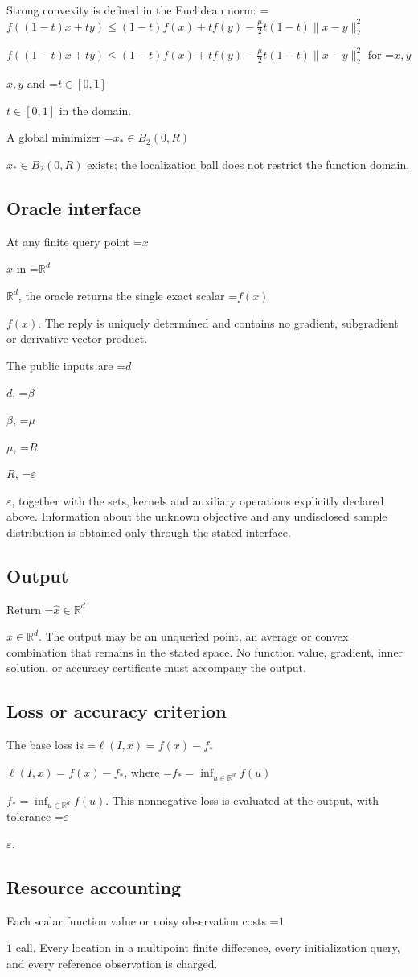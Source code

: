 \documentclass[10pt,a4paper]{article}
\newcommand{\AtlasMath}[1]{\par\begingroup\centering\setbox0=\hbox{$\displaystyle #1$}\ifdim\wd0>1.4\linewidth\typeout{ATLAS WIDE FORMULA: \the\wd0}\fi\ifdim\wd0>\linewidth\resizebox{\linewidth}{!}{\box0}\else\box0\fi\par\endgroup}
\newcommand{\AtlasInlineMath}[1]{\begingroup\setbox0=\hbox{$#1$}\ifdim\wd0>.4\linewidth\endgroup\AtlasMath{#1}\else\endgroup$#1$\fi}
\begin{document}
Strong convexity is defined in the Euclidean norm: \AtlasInlineMath{f((1-t)x+ty)\le(1-t)f(x)+tf(y)-\frac{\mu}{2}t(1-t)\|x-y\|_2^2} for \AtlasInlineMath{x,y} and \AtlasInlineMath{t\in[0,1]} in the domain.

A global minimizer \AtlasInlineMath{x_*\in B_2(0,R)} exists; the localization ball does not restrict the function domain.

\subsection{Oracle interface}
At any finite query point \AtlasInlineMath{x} in \AtlasInlineMath{\mathbb{R}^d}, the oracle returns the single exact scalar \AtlasInlineMath{f(x)}. The reply is uniquely determined and contains no gradient, subgradient or derivative-vector product.

The public inputs are \AtlasInlineMath{d}, \AtlasInlineMath{\beta}, \AtlasInlineMath{\mu}, \AtlasInlineMath{R}, \AtlasInlineMath{\varepsilon}, together with the sets, kernels and auxiliary operations explicitly declared above. Information about the unknown objective and any undisclosed sample distribution is obtained only through the stated interface.

\subsection{Output}
Return \AtlasInlineMath{\widehat{x}\in \mathbb{R}^d}. The output may be an unqueried point, an average or convex combination that remains in the stated space. No function value, gradient, inner solution, or accuracy certificate must accompany the output.

\subsection{Loss or accuracy criterion}
The base loss is \AtlasInlineMath{\ell(I,x)=f(x)-f_*}, where \AtlasInlineMath{f_*=\inf_{u\in \mathbb{R}^d}f(u)}. This nonnegative loss is evaluated at the output, with tolerance \AtlasInlineMath{\varepsilon}.

\subsection{Resource accounting}
Each scalar function value or noisy observation costs \AtlasInlineMath{1} call. Every location in a multipoint finite difference, every initialization query, and every reference observation is charged.
\end{document}
